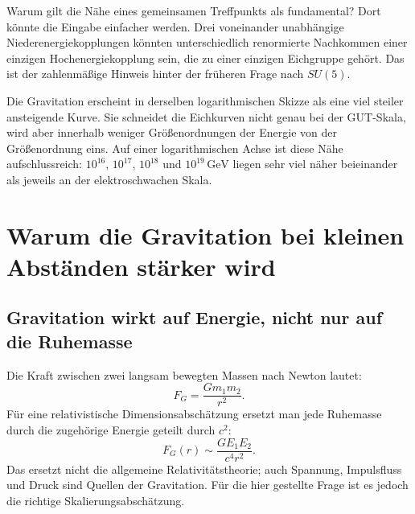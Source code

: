 Warum gilt die Nähe eines gemeinsamen Treffpunkts als fundamental? Dort könnte die Eingabe einfacher werden. Drei voneinander unabhängige Niederenergiekopplungen könnten unterschiedlich renormierte Nachkommen einer einzigen Hochenergiekopplung sein, die zu einer einzigen Eichgruppe gehört. Das ist der zahlenmäßige Hinweis hinter der früheren Frage nach \(SU(5)\).

Die Gravitation erscheint in derselben logarithmischen Skizze als eine viel steiler ansteigende Kurve. Sie schneidet die Eichkurven nicht genau bei der GUT-Skala, wird aber innerhalb weniger Größenordnungen der Energie von der Größenordnung eins. Auf einer logarithmischen Achse ist diese Nähe aufschlussreich: \(10^{16}\), \(10^{17}\), \(10^{18}\) und \(10^{19}\,\mathrm{GeV}\) liegen sehr viel näher beieinander als jeweils an der elektroschwachen Skala.

\section{Warum die Gravitation bei kleinen Abständen stärker wird}

\subsection{Gravitation wirkt auf Energie, nicht nur auf die Ruhemasse}

Die Kraft zwischen zwei langsam bewegten Massen nach Newton lautet:
\begin{equation}
  F_G=\frac{Gm_1m_2}{r^2}.
  \label{eq:l10-newton-force}
\end{equation}
Für eine relativistische Dimensionsabschätzung ersetzt man jede Ruhemasse durch die zugehörige Energie geteilt durch \(c^2\):
\begin{equation}
  F_G(r)\sim\frac{GE_1E_2}{c^4r^2}.
  \label{eq:l10-relativistic-gravity-force}
\end{equation}
Das ersetzt nicht die allgemeine Relativitätstheorie; auch Spannung, Impulsfluss und Druck sind Quellen der Gravitation. Für die hier gestellte Frage ist es jedoch die richtige Skalierungsabschätzung.

